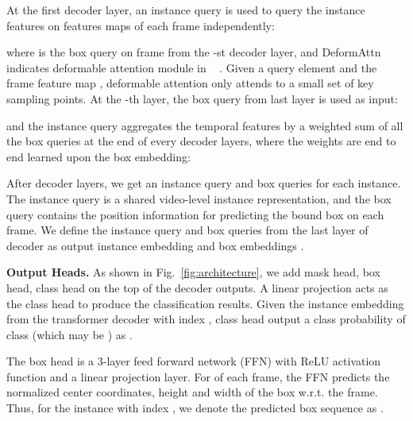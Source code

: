 \documentclass[runningheads]{llncs}
\begin{document}
At the first decoder layer, an instance query  is used to query the instance features on features maps of each frame independently:

where  is the box query on frame  from the -st decoder layer, and DeformAttn indicates deformable attention module in ~\cite{deformableDETR} . Given a query element and the frame feature map , deformable attention only attends to a small set of key sampling points.
At the -th  layer, the box query  from last layer is used as input:

and the instance query aggregates the temporal features by a weighted sum of all the box queries at the end of every decoder layers, where the weights are end to end learned upon the box embedding:

After  decoder layers, we get an instance query and  box queries for each instance. The instance query is a shared video-level instance representation, and the box query contains the position information for predicting the bound box on each frame. 
We define the instance query  and box queries  from the last layer of decoder as output instance embedding and box embeddings  .




\noindent\textbf{Output Heads.}
As shown in Fig.~\ref{fig:architecture}, we add mask head, box head, class head on the top of the decoder outputs.
A linear projection acts as the class head to produce the classification results. Given the instance embedding from the transformer decoder with index , class head output a class probability of class  (which may be ) as  .



The box head is a 3-layer feed forward network (FFN) with ReLU activation function and a linear projection layer. For  of each frame, the FFN predicts the normalized center coordinates, height and width of the box w.r.t. the frame. Thus, for the instance with index , we denote the predicted box sequence as 
. 
\end{document}
